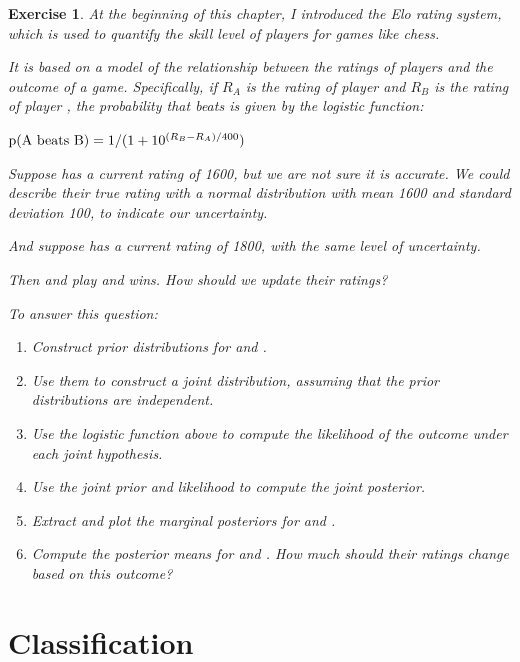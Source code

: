 \documentclass[12pt]{book}
\theoremstyle{exercise}
\newtheorem{exercise}{Exercise}[chapter]
\begin{document}
\begin{exercise}
At the beginning of this chapter, I introduced
the Elo rating system, which is used to quantify the skill level of players for games like chess.

It is based on a model of the relationship between the ratings of players and the outcome of a game.  Specifically, if $R_A$ is the rating of player  and $R_B$ is the rating of player , the probability that  beats  is given by the logistic function:

$\mathrm{p}(\mathrm{A~beats~B}) = 1 / (1 + 10^{(R_B-R_A)/400})$

Suppose  has a current rating of 1600, but we are not sure it is accurate.  We could describe their true rating with a normal distribution with mean 1600 and standard deviation 100, to indicate our uncertainty.

And suppose  has a current rating of 1800, with the same level of uncertainty.

Then  and  play and  wins.  How should we update their ratings?

To answer this question:

\begin{enumerate}

\item Construct prior distributions for  and .

\item Use them to construct a joint distribution, assuming that the prior distributions are independent.

\item Use the logistic function above to compute the likelihood of the outcome under each joint hypothesis.  

\item Use the joint prior and likelihood to compute the joint posterior. 

\item Extract and plot the marginal posteriors for  and .

\item Compute the posterior means for  and .  How much should their ratings change based on this outcome?

\end{enumerate}

\end{exercise}



\chapter{Classification}
\label{classification}
\end{document}
